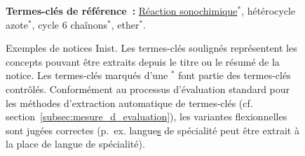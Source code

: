 \begin{figure}
\begin{minipage}{\linewidth}
{{          \vspace{-0.5em}
          \textbf{Termes-clés de référence~:} \underline{Réaction
          sonochimique$^*$}, hétérocycle azote$^*$, cycle 6 chaînons$^*$,
          ether$^*$.
        }
      }
    \end{minipage}
    \caption{Exemples de notices Inist. Les termes-clés soulignés représentent
             les concepts pouvant être extraits depuis le titre ou le résumé de
             la notice. Les termes-clés marqués d'une $^*$ font partie des
             termes-clés contrôlés. Conformément au processus d'évaluation
             standard pour les méthodes d'extraction automatique de termes-clés
             (cf. section~\ref{subsec:mesure_d_evaluation}), les variantes
             flexionnelles sont jugées correctes (p.~ex.
             \og{}langue\underline{s} de  spécialité\fg{} peut être extrait à la
             place de \og{}langue de spécialité\fg{}).
             \label{fig:exemple_notice_inist}}
  \end{figure}

